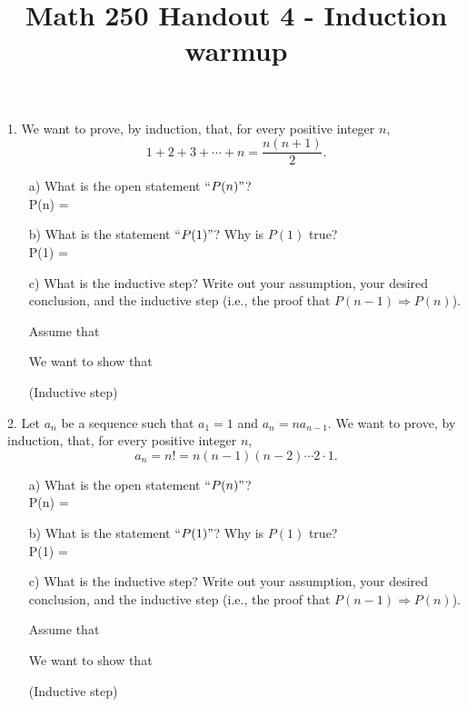 \documentclass[12pt, reqno]{amsart}
\begin{document}
\title[Math 250 Handout 4 - Induction warmup]{Math 250 Handout 4 - Induction warmup}\maketitle

\thispagestyle{empty}

1. We want to prove, by induction, that, for every positive integer $n$, 
\[
1 + 2 + 3 + \cdots + n = \frac{n(n+1)}{2}.
\]
\begin{itemize}
\item [a)] What is the open statement ``$P(n)"$?\\

P(n) = 
\vspace{1cm}
\item [b)] What is the statement ``$P(1)"$? Why is $P(1)$ true?\\

P(1) = 
\vspace{1cm}
\item [c)] What is the inductive step? Write out your assumption, your desired conclusion, and the inductive step (i.e., the proof that $P(n-1) \Rightarrow P(n)$).

 Assume that \\\vspace{0.5cm}

 We want to show that\\\vspace{0.5cm}

 (Inductive step)\\\vspace{0.5cm}

\end{itemize}

2. Let $a_n$ be a sequence such that $a_1 = 1$ and $a_n = na_{n-1}$. We want to prove, by induction, that, for every positive integer $n$, 
\[
a_n = n! = n(n-1)(n-2)\cdots 2\cdot 1.
\]
\begin{itemize}
\item [a)] What is the open statement ``$P(n)"$?\\

P(n) = 
\vspace{0.5cm}
\item [b)] What is the statement ``$P(1)"$? Why is $P(1)$ true?\\

P(1) = 
  \newpage
\vspace{0.5cm}
\item [c)] What is the inductive step? Write out your assumption, your desired conclusion, and the inductive step (i.e., the proof that $P(n-1) \Rightarrow P(n)$).

 Assume that \\\vspace{0.5cm}

 We want to show that\\\vspace{0.5cm}

 (Inductive step)\\\vspace{0.5cm}

\end{itemize}
\end{document}
